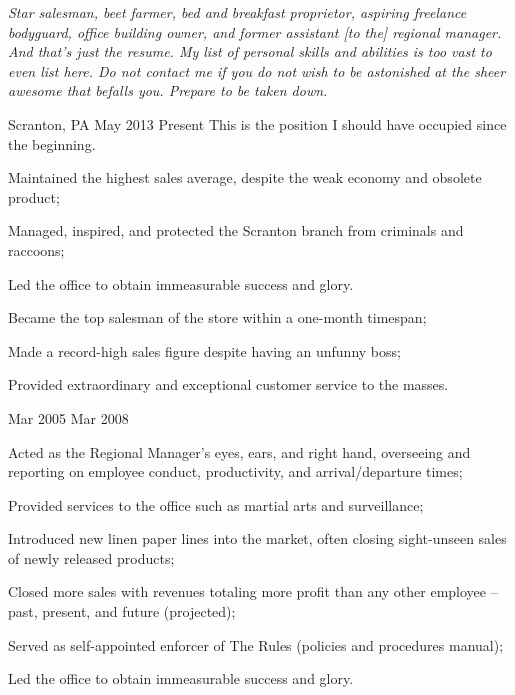 \documentclass{sleekcv}%
\begin{document}
\begin{bodycol}

	\begin{bodysection}[PROFILE]%
		\bodytext \itshape
			 Star salesman, beet farmer, bed and breakfast proprietor, aspiring freelance bodyguard, office building owner, and former assistant [to the] regional manager. And that's just the resume.	My list of personal skills and abilities is too vast to even list here.	Do not contact me if you do not wish to be astonished at the sheer awesome that befalls you. Prepare to be taken down.%
	\end{bodysection}%

	\begin{bodysection}%
		{Scranton, PA}
		{May 2013}
		{Present}
		{This is the position I should have occupied since the beginning.}
		\bodytext
		\begin{cvitemize}
			\item Maintained the highest sales average, despite the weak economy and obsolete product;
			\item Managed, inspired, and protected the Scranton branch from criminals and raccoons;
			\item Led the office to obtain immeasurable success and glory.
		\end{cvitemize}

		{}
		{}
		{}
		{}
		\bodytext
		\begin{cvitemize}
			\item Became the top salesman of the store within a one-month timespan;
			\item Made a record-high sales figure despite having an unfunny boss;
			\item Provided extraordinary and exceptional customer service to the masses.
		\end{cvitemize}

		{}
		{Mar 2005}
		{Mar 2008}
		{}
		\bodytext
		\begin{cvitemize}
			\item Acted as the Regional Manager's eyes, ears, and right hand, overseeing and reporting on employee conduct, productivity, and arrival/departure times;
			\item Provided services to the office such as martial arts and surveillance;
			\item Introduced new linen paper lines into the market, often closing sight-unseen sales of newly released products;
			\item Closed more sales with revenues totaling more profit than any other employee – past, present, and future (projected);
			\item Served as self-appointed enforcer of The Rules (policies and procedures manual);
			\item Led the office to obtain immeasurable success and glory.
		\end{cvitemize}
	\end{bodysection}


\end{bodycol}
\end{document}
